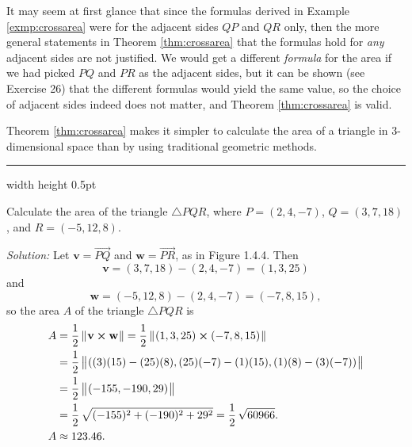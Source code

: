 It may seem at first glance that since the formulas derived in Example \ref{exmp:crossarea} were for the adjacent
sides $QP$ and $QR$ only, then the more general statements in Theorem \ref{thm:crossarea} that the formulas hold for
\emph{any} adjacent sides are not justified. We would get a different \emph{formula} for the area if we had
picked $PQ$ and $PR$ as the adjacent sides, but it can be shown (see Exercise 26) that the different formulas would
yield the same value, so the choice of adjacent sides indeed does not matter, and
Theorem \ref{thm:crossarea} is valid.

Theorem \ref{thm:crossarea} makes it simpler to calculate the area of a triangle in 3-dimensional space than by using
traditional geometric methods.

\vspace{4mm}
\hrule width \textwidth height 0.5pt
\begin{exmp}
 Calculate the area of the triangle $\triangle PQR$, where $P = (2,4,-7)$, $Q = (3,7,18)$, and
 $R =(-5,12,8)$.\vspace{1mm}
 \piccaption[]{}
 \par\noindent\emph{Solution:} Let $\textbf{v} = \overrightarrow{PQ}$ and $\textbf{w} = \overrightarrow{PR}$, as in
 Figure 1.4.4. 
 Then 
 \[\textbf{v} = (3,7,18) - (2,4,-7) = (1,3,25)\] 
 and 
 \[\textbf{w} = (-5,12,8) - (2,4,-7) = (-7,8,15),\]
 so the area $A$ of the triangle $\triangle PQR$ is
 \begin{align*}
 A &= \frac{1}{2}\,\lVert\mspace{1mu}\textbf{v} \bm{\times} \textbf{w}\mspace{1mu}\rVert = \frac{1}{2}\,\lVert\mspace{1mu}(1,3,25) \bm{\times} (-7,8,15)\mspace{1mu}\rVert\\
 &= \frac{1}{2}\,\bigl\lVert\mspace{1mu}((3)(15) - (25)(8), (25)(-7) - (1)(15), (1)(8) - (3)(-7))\mspace{1mu}\bigr\rVert\\
 &= \frac{1}{2}\,\bigl\lVert\mspace{1mu}(-155, -190, 29)\mspace{1mu}\bigr\rVert\\
 &= \frac{1}{2}\,\sqrt{(-155)^2 + (-190)^2 + 29^2} = \frac{1}{2}\,\sqrt{60966}.\\
 A &\approx 123.46.
 \end{align*}
 \end{exmp}
